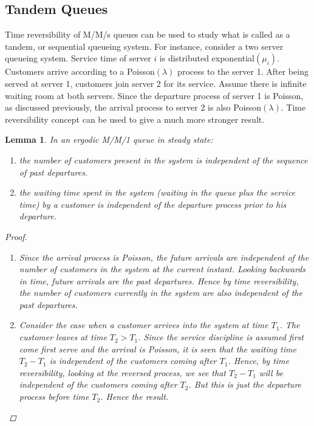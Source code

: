 \documentclass[a4paper,10pt]{article}
\theoremstyle{plain}
\newtheorem{lem}[thm]{Lemma}
\theoremstyle{definition}
\theoremstyle{remark}
\begin{document}
\subsection{Tandem Queues}
Time reversibility of M/M/s queues can be used to study what is called as a tandem, or sequential queueing system. For instance, consider a two server queueing system. Service time of server $i$ is distributed exponential$(\mu_i)$. Customers arrive according to a Poisson$(\lambda)$ process to the server 1. After being served at server 1, customers join server  2 for its service. Assume there is infinite waiting room at both servers. Since the departure process of server 1 is Poisson, as discussed previously, the arrival process to server 2 is also Poisson$(\lambda)$. Time reversibility concept can be used to give a much more stronger result.
\begin{lem}
In an ergodic M/M/1 queue in steady state:
\begin{enumerate}
\item the number of customers present in the system is independent of the sequence of past departures.
\item the waiting time spent in the system (waiting in the queue plus the service time) by a customer is independent of the departure process prior to his departure.
\end{enumerate} 
\begin{proof}
\begin{enumerate}
\item Since the arrival process is Poisson, the future arrivals are independent of the number of customers in the system at the current instant. Looking backwards in time, future arrivals are the past departures. Hence by time reversibility, the number of customers currently in the system are also independent of the past departures.
\item Consider the case when a customer arrives into the system at time $T_1$. The customer leaves at time $T_2>T_1$.  Since the service discipline is assumed first come first serve and the arrival is Poisson, it is seen that the waiting time $T_2-T_1$ is independent of the customers coming after $T_1$. Hence, by time reversibility, looking at the reversed process, we see that $T_2-T_1$  will be independent of the customers coming after $T_2$. But this is just the departure process before time $T_2$. Hence the result.
\end{enumerate}
\end{proof}
\end{lem} 
\end{document}
